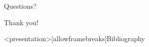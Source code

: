 \documentclass[utf8,t,xcolor=svgnames]{beamer}
\begin{document}
\begin{frame}[plain,c]
	
	\begin{center}
		{\Huge Questions?}
	\end{center}
	
	\vfill
	
	\begin{center}
		{\Huge Thank you!}
	\end{center}
	
\end{frame}



\appendix

\begin{frame}<presentation>[allowframebreaks]{Bibliography}
	\printbibliography
\end{frame}
\end{document}
